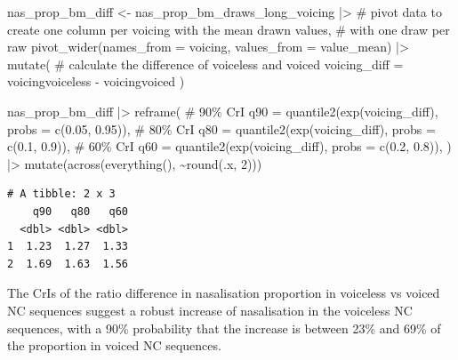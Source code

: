 \documentclass[
  authoryear,
  preprint,
  3p]{elsarticle}
\newenvironment{Shaded}{\begin{snugshade}}{\end{snugshade}}
\newcommand{\AttributeTok}[1]{\textcolor[rgb]{0.40,0.45,0.13}{#1}}
\newcommand{\CommentTok}[1]{\textcolor[rgb]{0.37,0.37,0.37}{#1}}
\newcommand{\DecValTok}[1]{\textcolor[rgb]{0.68,0.00,0.00}{#1}}
\newcommand{\FloatTok}[1]{\textcolor[rgb]{0.68,0.00,0.00}{#1}}
\newcommand{\FunctionTok}[1]{\textcolor[rgb]{0.28,0.35,0.67}{#1}}
\newcommand{\NormalTok}[1]{\textcolor[rgb]{0.00,0.23,0.31}{#1}}
\newcommand{\OtherTok}[1]{\textcolor[rgb]{0.00,0.23,0.31}{#1}}
\newcommand{\SpecialCharTok}[1]{\textcolor[rgb]{0.37,0.37,0.37}{#1}}
\begin{document}
\begin{Shaded}
\begin{Highlighting}[]
\NormalTok{nas\_prop\_bm\_diff }\OtherTok{\textless{}{-}}\NormalTok{ nas\_prop\_bm\_draws\_long\_voicing }\SpecialCharTok{|\textgreater{}} 
  \CommentTok{\# pivot data to create one column per voicing with the mean drawn values,}
  \CommentTok{\# with one draw per raw}
  \FunctionTok{pivot\_wider}\NormalTok{(}\AttributeTok{names\_from =}\NormalTok{ voicing, }\AttributeTok{values\_from =}\NormalTok{ value\_mean) }\SpecialCharTok{|\textgreater{}} 
  \FunctionTok{mutate}\NormalTok{(}
    \CommentTok{\# calculate the difference of voiceless and voiced}
    \AttributeTok{voicing\_diff =}\NormalTok{ voicingvoiceless }\SpecialCharTok{{-}}\NormalTok{ voicingvoiced}
\NormalTok{  )}

\NormalTok{nas\_prop\_bm\_diff }\SpecialCharTok{|\textgreater{}} 
  \FunctionTok{reframe}\NormalTok{(}
    \CommentTok{\# 90\% CrI}
    \AttributeTok{q90 =} \FunctionTok{quantile2}\NormalTok{(}\FunctionTok{exp}\NormalTok{(voicing\_diff), }\AttributeTok{probs =} \FunctionTok{c}\NormalTok{(}\FloatTok{0.05}\NormalTok{, }\FloatTok{0.95}\NormalTok{)),}
    \CommentTok{\# 80\% CrI}
    \AttributeTok{q80 =} \FunctionTok{quantile2}\NormalTok{(}\FunctionTok{exp}\NormalTok{(voicing\_diff), }\AttributeTok{probs =} \FunctionTok{c}\NormalTok{(}\FloatTok{0.1}\NormalTok{, }\FloatTok{0.9}\NormalTok{)),}
    \CommentTok{\# 60\% CrI}
    \AttributeTok{q60 =} \FunctionTok{quantile2}\NormalTok{(}\FunctionTok{exp}\NormalTok{(voicing\_diff), }\AttributeTok{probs =} \FunctionTok{c}\NormalTok{(}\FloatTok{0.2}\NormalTok{, }\FloatTok{0.8}\NormalTok{)),}
\NormalTok{  ) }\SpecialCharTok{|\textgreater{}} 
  \FunctionTok{mutate}\NormalTok{(}\FunctionTok{across}\NormalTok{(}\FunctionTok{everything}\NormalTok{(), }\SpecialCharTok{\textasciitilde{}}\FunctionTok{round}\NormalTok{(.x, }\DecValTok{2}\NormalTok{)))}
\end{Highlighting}
\end{Shaded}

\begin{verbatim}
# A tibble: 2 x 3
    q90   q80   q60
  <dbl> <dbl> <dbl>
1  1.23  1.27  1.33
2  1.69  1.63  1.56
\end{verbatim}

The CrIs of the ratio difference in nasalisation proportion in voiceless
vs voiced NC sequences suggest a robust increase of nasalisation in the
voiceless NC sequences, with a 90\% probability that the increase is
between 23\% and 69\% of the proportion in voiced NC sequences.
\end{document}
